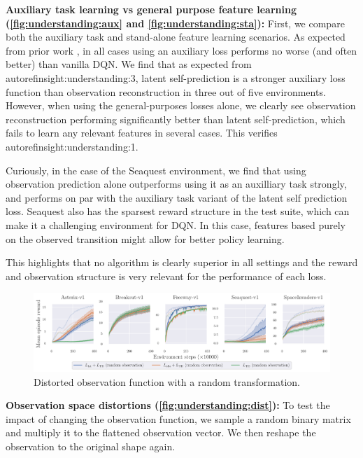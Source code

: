 \textbf{Auxiliary task learning vs general purpose feature learning (\autoref{fig:understanding:aux} and \autoref{fig:understanding:sta}):}
First, we compare both the auxiliary task and stand-alone feature learning scenarios.
As expected from prior work \parencite{jaderberg2016reinforcement,schwarzer2021dataefficient,farebrother2023protovalue}, in all cases using an auxiliary loss performs no worse (and often better) than vanilla DQN.
We find that as expected from \\autoref{insight:understanding:3}, latent self-prediction is a stronger auxiliary loss function than observation reconstruction in three out of five environments.
However, when using the general-purposes losses alone, we clearly see observation reconstruction performing significantly better than latent self-prediction, which fails to learn any relevant features in several cases. This verifies \\autoref{insight:understanding:1}.

Curiously, in the case of the Seaquest environment, we find that using observation prediction alone outperforms using it as an auxilliary task strongly, and performs on par with the auxiliary task variant of the latent self prediction loss.
Seaquest also has the sparsest reward structure in the test suite, which can make it a challenging environment for DQN. In this case, features based purely on the observed transition might allow for better policy learning.

This highlights that no algorithm is clearly superior in all settings and the reward and observation structure is very relevant for the performance of each loss.


\begin{figure}[t]
    \centering
    \includegraphics[width=\textwidth]{figures/understanding/rlc2024-distorted-fixed_minatar.pdf}
    \caption{Distorted observation function with a random transformation.}
    \label{fig:understanding:dist}
\end{figure}

\textbf{Observation space distortions (\autoref{fig:understanding:dist}):} To test the impact of changing the observation function, we sample a random binary matrix and multiply it to the flattened observation vector. We then reshape the observation to the original shape again.

